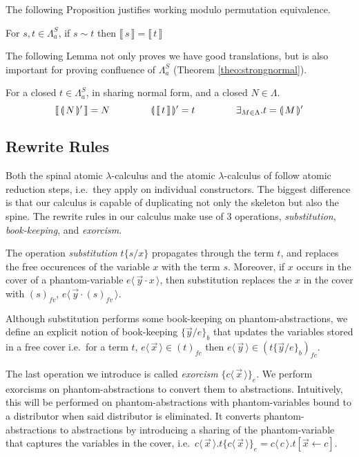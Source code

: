 \documentclass[a4paper,UKenglish,cleveref, autoref]{lipics-v2019}
\newcommand{\FALC}{\Lambda^{S}_{a}}
\newcommand{\fv}[1]{(#1)_{fv}}
\newcommand{\fc}[1]{(#1)_{fc}}
\newcommand{\fake}[3]{#1 \langle \, #2 \, \rangle . #3}
\newcommand{\share}[3]{#1 [#2 \leftarrow #3]}
\newcommand{\fakedist}[2]{#1 \langle \, #2 \, \rangle}
\newcommand{\sub}[3]{#1 \{ #2 / #3 \}}
\newcommand{\psub}[3]{#1 \{ #2 / #3 \}_{b}}
\newcommand{\exor}[3]{#1 \{ \fakedist{#2}{#3} \}_{e}}
\newcommand{\readback}[2]{\llbracket \, #1 \, \rrbracket}
\newcommand{\compile}[1]{\llparenthesis \, #1 \, \rrparenthesis}
\newcommand{\trans}[1]{\llbracket \, #1 \, \rrbracket}
\begin{document}
\noindent The following Proposition justifies working modulo permutation equivalence.

\begin{proposition}
\label{lem:preservedenotationsim}
For $s, t \in \FALC$, if $s \sim t$ then $\trans{s} = \trans{t}$ 
\end{proposition}

\noindent The following Lemma not only proves we have good translations, but is also important for proving confluence of $\FALC$ (Theorem \ref{theo:strongnormal}).

\begin{lemma}
\label{lem:preserve1to1correspondance}
For a closed $t \in \FALC$, in sharing normal form, and a closed $N \in \Lambda$.  
$$\readback{\compile{N}'}{I} = N \hspace{1.5cm} \compile{\readback{t}{I}}' = t \hspace{1.5cm} \exists_{ M \in \Lambda} . t = \compile{M}'$$ 
\end{lemma}

\subsection{Rewrite Rules}

Both the spinal atomic $\lambda$-calculus and the atomic $\lambda$-calculus of \cite{gundersen2013atomic} follow atomic reduction steps, i.e.\ they apply on individual constructors. The biggest difference is that our calculus is capable of duplicating not only the skeleton but also the spine. The rewrite rules in our calculus make use of 3 operations, \emph{substitution}, \emph{book-keeping}, and \emph{exorcism}.

The operation \emph{substitution} $\sub{t}{s}{x}$ propagates through the term $t$, and replaces the free occurences of the variable $x$ with the term $s$. Moreover, if $x$ occurs in the cover of a phantom-variable $\fakedist{e}{\vec{y} \cdot x}$, then substitution replaces the $x$ in the cover with $\fv{s}$, $\fakedist{e}{\vec{y} \cdot \fv{s}}$.

Although substitution performs some book-keeping on phantom-abstractions, we define an explicit notion of book-keeping $\psub{}{\vec{y}}{e}$ that updates the variables stored in a free cover i.e.\ for a term $t$, $\fakedist{e}{\vec{x}} \in \fc{t}$ then $\fakedist{e}{\vec{y}} \in \fc{\psub{t}{\vec{y}}{e}}$.

The last operation we introduce is called \emph{exorcism} $\exor{}{c}{\vec{x}}$. We perform exorcisms on phantom-abstractions to convert them to abstractions. Intuitively, this will be performed on phantom-abstractions with phantom-variables bound to a distributor when said distributor is eliminated. It converts phantom-abstractions to abstractions by introducing a sharing of the phantom-variable that captures the variables in the cover, i.e.\ $\fake{c}{\vec{x}}{t} \exor{}{c}{\vec{x}} = \fake{c}{c}{\share{t}{\vec{x}}{c}}$.
\end{document}
